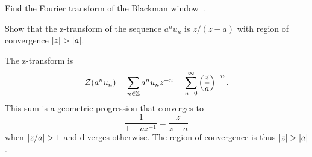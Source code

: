 \begin{excersizelist}
\begin{solution}
{
}


\end{solution}

\item \label{exer:blackmawindowfouriertransform} Find the Fourier transform of the Blackman window~.

\item \label{exer:stepseqZtrans} Show that the z-transform of the sequence  $a^nu_n$ is $z/(z-a)$ with region of convergence $\left\vert z \right\vert > \left\vert a \right\vert$.
\begin{solution}
The z-transform is
\[
{\mathcal Z}(a^nu_n) = \sum_{n \in {\mathbb Z}} a^n u_n z^{-n} = \sum_{n=0}^\infty \left(\frac{z}{a}\right)^{-n}.
\]
This sum is a geometric progression that converges to 
\[
\frac{1}{1- a z^{-1}} = \frac{z}{ z-a}
\]
when $\left\vert z/a \right\vert > 1$ and diverges otherwise.  The region of convergence is thus $\left\vert z \right\vert > \left\vert a \right\vert$.
\end{solution}


\end{excersizelist}
